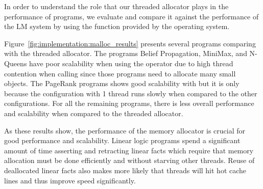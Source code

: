 In order to understand the role that our threaded allocator plays in the
performance of programs, we evaluate and compare it against the performance of
the LM system by using the  function provided by the operating
system.

Figure~\ref{fig:implementation:malloc_results} presents several programs
comparing  with the threaded allocator. The programs Belief
Propagation, MiniMax, and N-Queens have poor scalability when using the
 operator due to high thread contention when calling 
since those programs need to allocate many small objects. The PageRank programs
shows good scalability with  but it is only because the
configuration with 1 thread runs slowly when compared to the other
configurations. For all the remaining programs, there is less overall
performance and scalability when compared to the threaded allocator.

As these results show, the performance of the memory allocator is crucial for
good performance and scalability. Linear logic programs spend a significant
amount of time asserting and retracting linear facts which require that memory
allocation must be done efficiently and without starving other threads. Reuse of
deallocated linear facts also makes more likely that threads will hit hot cache
lines and thus improve speed significantly.

\newcommand{\smallplotsize}[0]{0.3}

